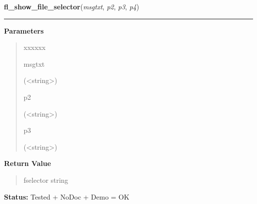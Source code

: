     \vspace{0.5ex}

\hspace{.8\funcindent}\begin{boxedminipage}{\funcwidth}

    \raggedright \textbf{fl\_show\_file\_selector}(\textit{msgtxt}, \textit{p2}, \textit{p3}, \textit{p4})

    \vspace{-1.5ex}

    \rule{\textwidth}{0.5\fboxrule}
\setlength{\parskip}{2ex}
\setlength{\parskip}{1ex}
      \textbf{Parameters}
      \vspace{-1ex}

      \begin{quote}
        \begin{Ventry}{xxxxxx}

          \item[msgtxt]

          ({\textless}string{\textgreater})

          \item[p2]

          ({\textless}string{\textgreater})

          \item[p3]

          ({\textless}string{\textgreater})

        \end{Ventry}

      \end{quote}

      \textbf{Return Value}
    \vspace{-1ex}

      \begin{quote}
      fselector string

      \end{quote}

\textbf{Status:} Tested + NoDoc + Demo = OK



    \end{boxedminipage}

    \label{xformslib:library:fl_set_fselector_fontsize}

    \vspace{0.5ex}


